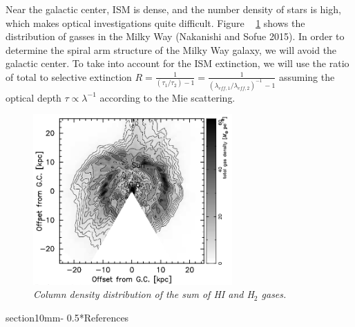 \documentclass[letterpaper,11pt]{article}
\makeatletter
\renewcommand{\section}{\@startsection%
{section}{1}{0mm}{-\baselineskip}%
{0.5\baselineskip}{\normalfont\Large\bfseries}}%
\makeatother
\begin{document}
Near the galactic center, ISM is dense, and the number density of stars is high, which makes optical investigations quite difficult. Figure ~ \ref{fig:gas} shows the distribution of gasses in the Milky Way (Nakanishi and Sofue 2015). In order to determine the spiral arm structure of the Milky Way galaxy, we will avoid the galactic center. To take into account for the ISM extinction, we will use the ratio of total to selective extinction $R = \frac{1}{(\tau_{1} / \tau_{2}) -1} = \frac{1}{(\lambda_{eff,1} / \lambda_{eff,2})^{-1} \, -1}$ assuming the optical depth $\tau \propto \lambda^{-1}$ according to the Mie scattering. 

\begin{figure}[htb!]
  \begin{center}
\centerline{\includegraphics[width=3in]{figures/Gas.png}}
\caption{\it \small{Column density distribution of the sum of HI and H$_2$ gases. \label{fig:gas}}}
  \end{center}
\end{figure}



\section*{References}

\noindent{}

\noindent{}

\noindent{}
\end{document}
